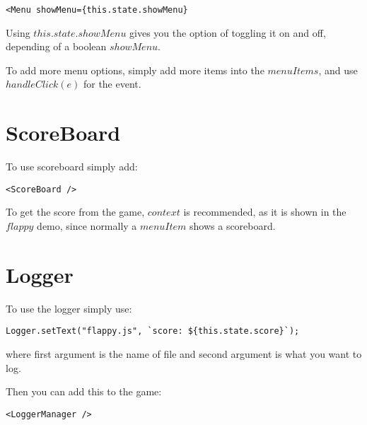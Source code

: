 \begin{lstlisting}
<Menu showMenu={this.state.showMenu}
\end{lstlisting}

Using ${this.state.showMenu}$ gives you the option of toggling it on and off, depending of a boolean $showMenu$.

To add more menu options, simply add more items into the $menuItems$, and use $handleClick(e)$ for the event.

\section{ScoreBoard}
To use scoreboard simply add:

\begin{lstlisting}
<ScoreBoard />
\end{lstlisting}

To get the score from the game, $context$ is recommended, as it is shown in the $flappy$ demo, since normally a $menuItem$ shows a scoreboard.

\section{Logger}
To use the logger simply use:

\begin{lstlisting}
Logger.setText("flappy.js", `score: ${this.state.score}`);
\end{lstlisting}

where first argument is the name of file and second argument is what you want to log.

Then you can add this to the game:
\begin{lstlisting}
<LoggerManager /> 
\end{lstlisting}

  